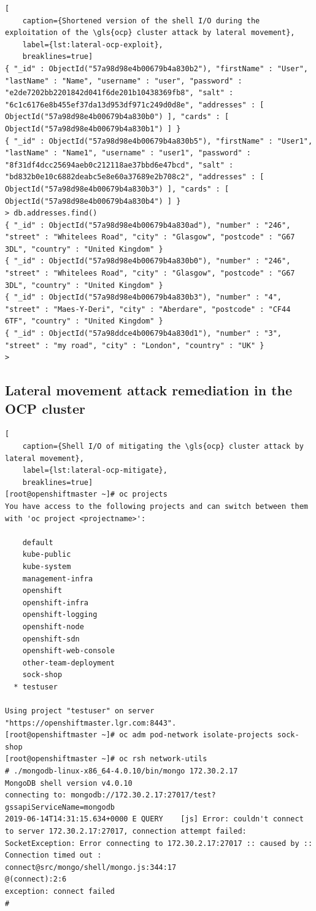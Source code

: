 \begin{lstlisting}[
	caption={Shortened version of the shell I/O during the exploitation of the \gls{ocp} cluster attack by lateral movement},
	label={lst:lateral-ocp-exploit},
	breaklines=true]
{ "_id" : ObjectId("57a98d98e4b00679b4a830b2"), "firstName" : "User", "lastName" : "Name", "username" : "user", "password" : "e2de7202bb2201842d041f6de201b10438369fb8", "salt" : "6c1c6176e8b455ef37da13d953df971c249d0d8e", "addresses" : [ ObjectId("57a98d98e4b00679b4a830b0") ], "cards" : [ ObjectId("57a98d98e4b00679b4a830b1") ] }
{ "_id" : ObjectId("57a98d98e4b00679b4a830b5"), "firstName" : "User1", "lastName" : "Name1", "username" : "user1", "password" : "8f31df4dcc25694aeb0c212118ae37bbd6e47bcd", "salt" : "bd832b0e10c6882deabc5e8e60a37689e2b708c2", "addresses" : [ ObjectId("57a98d98e4b00679b4a830b3") ], "cards" : [ ObjectId("57a98d98e4b00679b4a830b4") ] }
> db.addresses.find()
{ "_id" : ObjectId("57a98d98e4b00679b4a830ad"), "number" : "246", "street" : "Whitelees Road", "city" : "Glasgow", "postcode" : "G67 3DL", "country" : "United Kingdom" }
{ "_id" : ObjectId("57a98d98e4b00679b4a830b0"), "number" : "246", "street" : "Whitelees Road", "city" : "Glasgow", "postcode" : "G67 3DL", "country" : "United Kingdom" }
{ "_id" : ObjectId("57a98d98e4b00679b4a830b3"), "number" : "4", "street" : "Maes-Y-Deri", "city" : "Aberdare", "postcode" : "CF44 6TF", "country" : "United Kingdom" }
{ "_id" : ObjectId("57a98ddce4b00679b4a830d1"), "number" : "3", "street" : "my road", "city" : "London", "country" : "UK" }
>
\end{lstlisting}

\subsection{Lateral movement attack remediation in the OCP cluster}
\begin{lstlisting}[
	caption={Shell I/O of mitigating the \gls{ocp} cluster attack by lateral movement},
	label={lst:lateral-ocp-mitigate},
	breaklines=true]
[root@openshiftmaster ~]# oc projects
You have access to the following projects and can switch between them with 'oc project <projectname>':

    default
    kube-public
    kube-system
    management-infra
    openshift
    openshift-infra
    openshift-logging
    openshift-node
    openshift-sdn
    openshift-web-console
    other-team-deployment
    sock-shop
  * testuser

Using project "testuser" on server "https://openshiftmaster.lgr.com:8443".
[root@openshiftmaster ~]# oc adm pod-network isolate-projects sock-shop
[root@openshiftmaster ~]# oc rsh network-utils
# ./mongodb-linux-x86_64-4.0.10/bin/mongo 172.30.2.17
MongoDB shell version v4.0.10
connecting to: mongodb://172.30.2.17:27017/test?gssapiServiceName=mongodb
2019-06-14T14:31:15.634+0000 E QUERY    [js] Error: couldn't connect to server 172.30.2.17:27017, connection attempt failed: SocketException: Error connecting to 172.30.2.17:27017 :: caused by :: Connection timed out :
connect@src/mongo/shell/mongo.js:344:17
@(connect):2:6
exception: connect failed
#
\end{lstlisting}
